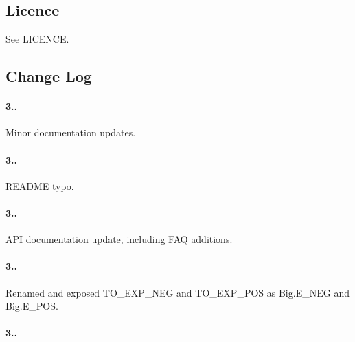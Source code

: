 \subsection*{Licence}

See L\+I\+C\+E\+N\+CE.

\subsection*{Change Log}

\paragraph*{3..}


\begin{DoxyItemize}
\item Minor documentation updates.
\end{DoxyItemize}

\paragraph*{3..}


\begin{DoxyItemize}
\item R\+E\+A\+D\+ME typo.
\end{DoxyItemize}

\paragraph*{3..}


\begin{DoxyItemize}
\item A\+PI documentation update, including F\+AQ additions.
\end{DoxyItemize}

\paragraph*{3..}


\begin{DoxyItemize}
\item Renamed and exposed {\ttfamily T\+O\+\_\+\+E\+X\+P\+\_\+\+N\+EG} and {\ttfamily T\+O\+\_\+\+E\+X\+P\+\_\+\+P\+OS} as {\ttfamily Big.\+E\+\_\+\+N\+EG} and {\ttfamily Big.\+E\+\_\+\+P\+OS}.
\end{DoxyItemize}

\paragraph*{3..}


